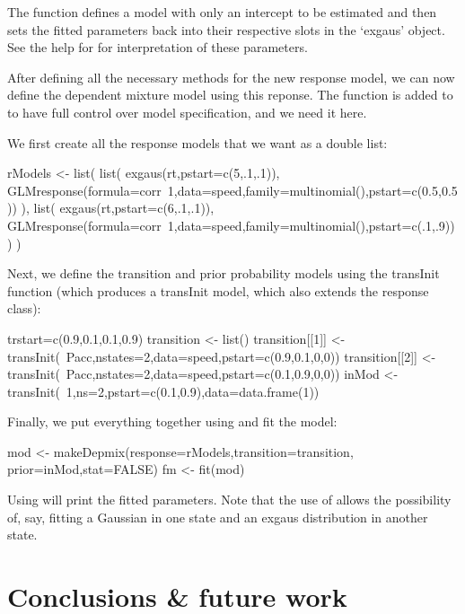 \documentclass[article]{jss}
\begin{document}
The  function defines a  model with 
only an intercept to be estimated and then sets the fitted parameters 
back into their respective slots in the `exgaus' object. See the help 
for  for interpretation of these parameters. 

After defining all the necessary methods for the new response model, 
we can  now define the dependent mixture model using this reponse. 
The function  is added to  to have 
full control over model specification, and we need it here. 

We first create all the response models that we want as a double list: 
\begin{CodeChunk}
\begin{CodeInput}
rModels <- list(
	list(
		exgaus(rt,pstart=c(5,.1,.1)),
		GLMresponse(formula=corr~1,data=speed,family=multinomial(),pstart=c(0.5,0.5))
	),
	list(
		exgaus(rt,pstart=c(6,.1,.1)),
		GLMresponse(formula=corr~1,data=speed,family=multinomial(),pstart=c(.1,.9))
	)
)
\end{CodeInput}
\end{CodeChunk}
Next, we define the transition and prior probability models using the 
transInit function (which produces a transInit model, which also extends 
the response class): 
\begin{CodeChunk}
\begin{CodeInput}
trstart=c(0.9,0.1,0.1,0.9)
transition <- list()
transition[[1]] <- transInit(~Pacc,nstates=2,data=speed,pstart=c(0.9,0.1,0,0))
transition[[2]] <- transInit(~Pacc,nstates=2,data=speed,pstart=c(0.1,0.9,0,0))
inMod <- transInit(~1,ns=2,pstart=c(0.1,0.9),data=data.frame(1))
\end{CodeInput}
\end{CodeChunk}
Finally, we put everything together using  and fit 
the model: 
\begin{CodeChunk}
\begin{CodeInput}
mod <- makeDepmix(response=rModels,transition=transition,
prior=inMod,stat=FALSE)
fm <- fit(mod)
\end{CodeInput}
\end{CodeChunk}

Using  will print the fitted parameters. Note that the 
use of  allows the possibility of, say, fitting a 
Gaussian in one state and an exgaus distribution in another state. 


\section[Conclusions and future work]{Conclusions \& future work}
\end{document}
